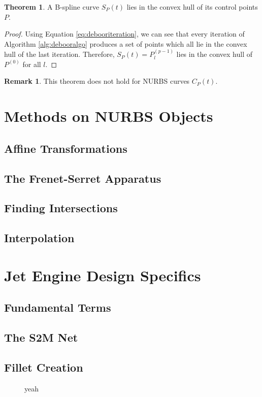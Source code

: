 \documentclass[a4paper, 11pt]{report}
\theoremstyle{definition}
\newtheorem{theorem}[definition]{Theorem}
\newtheorem*{remark}{Remark}
\begin{document}
\begin{theorem}
	A B-spline curve $S_P(t)$ lies in the convex hull of its control points $P$.
\end{theorem}
\begin{proof}
	Using Equation \ref{eq:debooriteration}, we can see that every iteration of Algorithm \ref{alg:debooralgo} produces a set of points which all lie in the convex hull of the last iteration. Therefore, $S_P(t) = P^{(p-1)}_l$ lies in the convex hull of $P^{(0)}$ for all $l$.
\end{proof}
\begin{remark}
	This theorem does not hold for NURBS curves $C_P(t)$.
\end{remark}

\section{Methods on NURBS Objects}
\subsection{Affine Transformations}
\subsection{The Frenet-Serret Apparatus}
\subsection{Finding Intersections}
\subsection{Interpolation}

\section{Jet Engine Design Specifics}
\subsection{Fundamental Terms}
\subsection{The S2M Net}
\subsection{Fillet Creation}
\begin{figure}[H]
	\centering
	
	\caption{yeah}
\end{figure}
\end{document}
